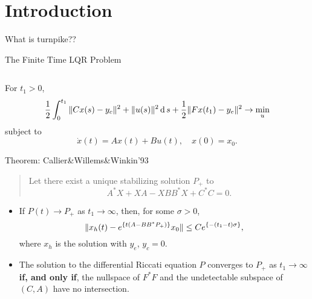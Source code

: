 \section{Introduction}\label{introduction}

\begin{frame}{}

\pause

What is turnpike??

\end{frame}

\begin{frame}{The Finite Time LQR Problem}

\[
\DeclareMathOperator{\inva}{d}
\newcommand\mxp[1]{e^{\{#1\}}}
\]

For \(t_1>0\),
\[\frac 12 \int_{0}^{t_1} \|Cx(s)-y_c\|^2+ \|u(s)\|^2 \inva{s} + \frac 12 \|F x(t_1)-y_e\|^2 \to \min_u\]
subject to \[\dot x(t) = Ax(t) + Bu(t), \quad x(0)=x_0.\]

\end{frame}


\begin{frame}{Theorem: Callier\&Willems\&Winkin'93}

\begin{quote}
Let there exist a unique stabilizing solution \(P _ +\) to
\[A^ * X+XA-XBB^ * X+C^ * C=0 .\]
\end{quote}

\begin{itemize}
\item
  If \(P(t) \to P _ +\) as \(t_1\to \infty\), then, for some
  \(\sigma>0\),
  \[\|x _ h(t) - \mxp{t(A-BB^ * P _ +)}x_0\| \leq Ce^{\{-(t_1-t)\sigma \}},\]
  where \(x _ h\) is the solution with \(y _ e\), \(y _ c=0\).
\item
  The solution to the differential Riccati equation \(P\) converges to
  \(P _ +\) as \(t_1\to \infty\) \textbf{if, and only if}, the nullspace
  of \(F^ * F\) and the undetectable subspace of \((C,A)\) have no
  intersection.
\end{itemize}

\end{frame}

